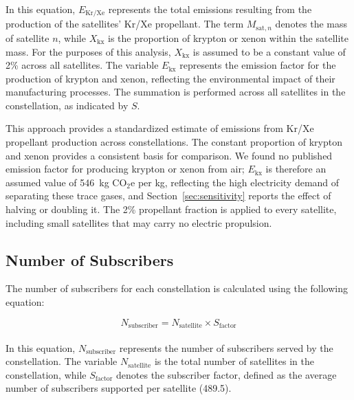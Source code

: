 \documentclass[pdflatex,sn-mathphys-num]{sn-jnl}
\theoremstyle{thmstyleone}%
\theoremstyle{thmstyletwo}%
\theoremstyle{thmstylethree}%
\begin{document}
In this equation, \( E_{\text{Kr/Xe}} \) represents the total emissions resulting from the production of the satellites' Kr/Xe propellant. The term \( M_{\text{sat},n} \) denotes the mass of satellite \( n \), while \( X_{\text{kx}} \) is the proportion of krypton or xenon within the satellite mass. For the purposes of this analysis, \( X_{\text{kx}} \) is assumed to be a constant value of 2\% across all satellites. The variable \( E_{\text{kx}} \) represents the emission factor for the production of krypton and xenon, reflecting the environmental impact of their manufacturing processes. The summation is performed across all satellites in the constellation, as indicated by \( S \).

This approach provides a standardized estimate of emissions from Kr/Xe propellant production across constellations. The constant proportion of krypton and xenon provides a consistent basis for comparison. We found no published emission factor for producing krypton or xenon from air; \( E_{\text{kx}} \) is therefore an assumed value of 546~kg CO$_2$e per kg, reflecting the high electricity demand of separating these trace gases, and Section~\ref{sec:sensitivity} reports the effect of halving or doubling it. The 2\% propellant fraction is applied to every satellite, including small satellites that may carry no electric propulsion.

\subsection{Number of Subscribers}\label{sec:subscribers}

The number of subscribers for each constellation is calculated using the following equation:

\begin{equation}
N_{\text{subscriber}} = N_{\text{satellite}} \times S_{\text{factor}}
\end{equation}
\\
In this equation, \( N_{\text{subscriber}} \) represents the number of subscribers served by the constellation. The variable \( N_{\text{satellite}} \) is the total number of satellites in the constellation, while \( S_{\text{factor}} \) denotes the subscriber factor, defined as the average number of subscribers supported per satellite (489.5).
\end{document}
